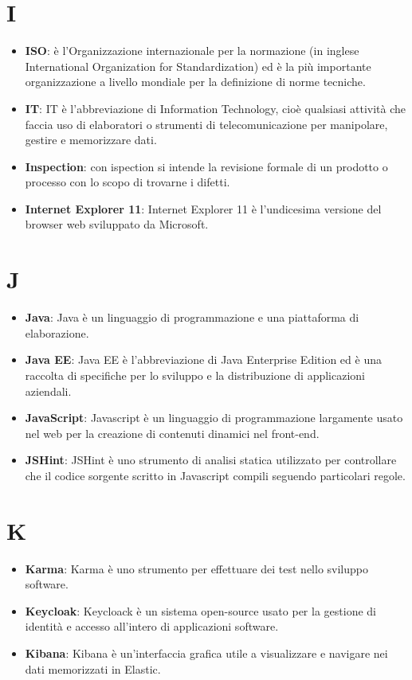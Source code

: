 \documentclass[a4paper, oneside, openany]{article}
\begin{document}
\section{I}
\begin{itemize}
\item \textbf{ISO}: è l'Organizzazione internazionale per la normazione (in inglese International Organization for Standardization) ed è la più importante organizzazione a livello mondiale per la definizione di norme tecniche.
\item \textbf{IT}: IT è l'abbreviazione di Information Technology, cioè qualsiasi attività che faccia uso di elaboratori o strumenti di telecomunicazione per manipolare, gestire e memorizzare dati.
\item \textbf{Inspection}:  con ispection si intende la revisione formale di un prodotto o processo con lo scopo di trovarne i difetti.
\item \textbf{Internet Explorer 11}: Internet Explorer 11 è l'undicesima versione del browser web sviluppato da Microsoft.

\end{itemize}

\section{J}
\begin{itemize}
\item \textbf{Java}: Java è un linguaggio di programmazione e una piattaforma di elaborazione.
\item \textbf{Java EE}: Java EE è l'abbreviazione di Java Enterprise Edition ed è una raccolta di specifiche per lo sviluppo e la distribuzione di applicazioni aziendali.	
\item \textbf{JavaScript}: Javascript è un linguaggio di programmazione largamente usato nel web per la creazione di contenuti dinamici nel front-end. 
\item \textbf{JSHint}: JSHint è uno strumento di analisi statica utilizzato per controllare che il codice sorgente scritto in Javascript compili seguendo particolari regole.
\end{itemize}

\section{K}
\begin{itemize}
\item \textbf{Karma}: Karma è uno strumento per effettuare dei test nello sviluppo software. 
\item \textbf{Keycloak}: Keycloack è un sistema open-source usato per la gestione di identità e accesso all'intero di applicazioni software.
\item \textbf{Kibana}: Kibana è un'interfaccia grafica utile a visualizzare e navigare nei dati memorizzati in Elastic.
\end{itemize}
\end{document}
